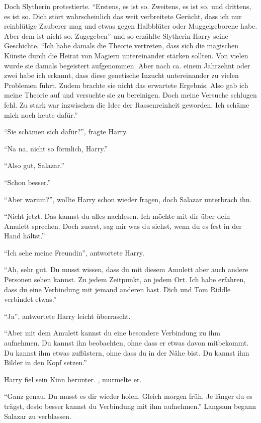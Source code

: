 Doch Slytherin protestierte. \enquote{Erstens, es ist so. Zweitens, es ist so, und drittens, es ist so. \gst Dich stört wahrscheinlich das weit verbreitete Gerücht, dass ich nur reinblütige Zauberer mag und etwas gegen Halbblüter oder Muggelgeborene habe. Aber dem ist nicht so. Zugegeben\abs} und so erzählte Slytherin Harry seine Geschichte. \enquote{Ich habe damals die Theorie vertreten, dass sich die magischen Künste durch die Heirat von Magiern untereinander stärken sollten. Von vielen wurde sie damals begeistert aufgenommen. Aber nach ca. einem Jahrzehnt oder zwei habe ich erkannt, dass diese genetische Inzucht untereinander zu vielen Problemen führt. Zudem brachte sie nicht das erwartete Ergebnis. Also gab ich meine Theorie auf und versuchte sie zu bereinigen. Doch meine Versuche schlugen fehl. Zu stark war inzwischen die Idee der Rassenreinheit geworden. \gst Ich schäme mich noch heute dafür.}

\enquote{Sie schämen sich dafür?}, fragte Harry.

\enquote{Na na, nicht so förmlich, Harry.}

\enquote{Also gut, Salazar.}

\enquote{Schon besser.}

\enquote{Aber warum?}, wollte Harry schon wieder fragen, doch Salazar unterbrach ihn.

\enquote{Nicht jetzt. Das kannst du alles nachlesen. Ich möchte mit dir über dein Amulett sprechen. \gst Doch zuerst, sag mir was du siehst, wenn du es fest in der Hand hältst.}

\enquote{Ich sehe meine Freundin}, antwortete Harry.

\enquote{Ah, sehr gut. Du musst wissen, dass du mit diesem Amulett aber auch andere Personen sehen kannst. Zu jedem Zeitpunkt, an jedem Ort. \gst Ich habe erfahren, dass du eine Verbindung mit jemand anderen hast. Dich und Tom Riddle verbindet etwas.}

\enquote{Ja}, antwortete Harry leicht überrascht.

\enquote{Aber mit dem Amulett kannst du eine besondere Verbindung zu ihm aufnehmen. Du kannst ihn beobachten, ohne dass er etwas davon mitbekommt. Du kannst ihm etwas zuflüstern, ohne dass du in der Nähe bist. Du kannst ihm Bilder in den Kopf setzen.}

Harry fiel sein Kinn herunter. , murmelte er.

\enquote{Ganz genau. Du musst es dir wieder holen. Gleich morgen früh. Je länger du es trägst, desto besser kannst du Verbindung mit ihm aufnehmen.} Langsam begann Salazar zu verblassen.

